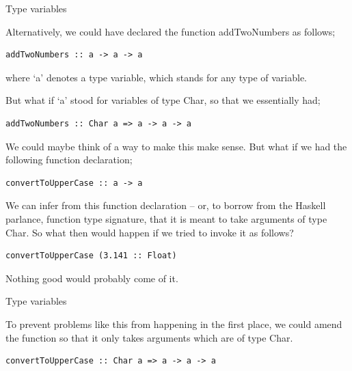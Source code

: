 \begin{frame}[t, fragile]{Type variables}

Alternatively, we could have declared the function addTwoNumbers as follows;

\begin{verbatim}
addTwoNumbers :: a -> a -> a
\end{verbatim}

where `a' denotes a type variable, which stands for any type of variable.

But what if `a' stood for variables of type Char, so that we essentially had;

\begin{verbatim}
addTwoNumbers :: Char a => a -> a -> a
\end{verbatim}

We could maybe think of a way to make this make sense. But what if we had the following function declaration;

\begin{verbatim}
convertToUpperCase :: a -> a
\end{verbatim}

We can infer from this function declaration -- or, to borrow from the  Haskell parlance, function type signature, that
it is meant to take arguments of type Char. So what then would happen if we tried to invoke it as follows?

\begin{verbatim}
convertToUpperCase (3.141 :: Float)
\end{verbatim}

Nothing good would probably come of it.

\end{frame}



\begin{frame}[t, fragile]{Type variables}

To prevent problems like this from happening in the first place, we could amend the function so that it only takes
arguments which are of type Char.

\begin{verbatim}
convertToUpperCase :: Char a => a -> a -> a
\end{verbatim}


\end{frame}